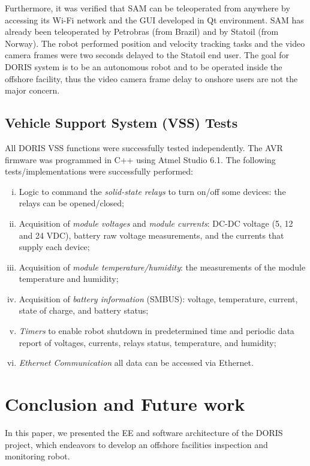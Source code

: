 \documentclass{ifacconf}
\begin{document}
Furthermore, it was verified that SAM can be teleoperated from anywhere by
accessing its Wi-Fi network and the GUI developed in Qt environment. SAM has
already been teleoperated by Petrobras (from Brazil) and by Statoil (from Norway). The robot performed position and
velocity tracking tasks and the video camera frames were two seconds delayed
to the Statoil end user. The goal for DORIS system is to be an autonomous robot
and to be operated inside the offshore facility, thus the video camera frame
delay to onshore users are not the major concern.

\subsection{Vehicle Support System (VSS) Tests}\label{sec:VSS_tests}
All DORIS VSS functions were successfully tested independently. The AVR firmware was programmed in C++ using Atmel Studio 6.1.
The following tests/implementations were successfully performed:
\begin{enumerate}[i)]
    \item Logic to command the \emph{solid-state relays} to turn on/off some devices: the
    relays can be opened/closed;
    \item Acquisition of \emph{module voltages} and \emph{module currents}:
    DC-DC voltage (5, 12 and 24 VDC), battery raw voltage measurements, and the
    currents that supply each device;
    \item Acquisition of \emph{module temperature/humidity}: the measurements of
    the module temperature and humidity;
    \item Acquisition of \emph{battery information} (SMBUS): voltage,
    temperature, current, state of charge, and battery status;
    \item \emph{Timers} to enable robot shutdown in predetermined time and
    periodic data report of voltages, currents, relays status, temperature, and
    humidity;
    \item \emph{Ethernet Communication} all data can be accessed via Ethernet.
\end{enumerate}

\section{Conclusion and Future work}\label{sec:conclusions}

In this paper, we presented the EE and software architecture
of the DORIS project, which endeavors to develop an offshore facilities inspection and monitoring robot.
\end{document}
